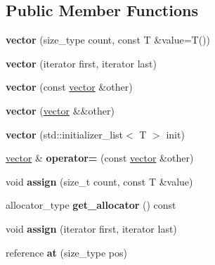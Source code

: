 \subsection*{Public Member Functions}
\begin{DoxyCompactItemize}
\item 
\mbox{\label{classvector_a1cc23d522dbc47bd2a178231685dd107}} 
{\bfseries vector} (size\+\_\+type count, const T \&value=T())
\item 
\mbox{\label{classvector_a795fe0c0a4f30d82ca01bf303053cfff}} 
{\bfseries vector} (iterator first, iterator last)
\item 
\mbox{\label{classvector_ab518694104914506f6f37d41208bf272}} 
{\bfseries vector} (const \mbox{\hyperlink{classvector}{vector}} \&other)
\item 
\mbox{\label{classvector_a87cb2a7a7e51160b390e815b45fbfca9}} 
{\bfseries vector} (\mbox{\hyperlink{classvector}{vector}} \&\&other)
\item 
\mbox{\label{classvector_aa4b69215b0307c01eb62115755b0888d}} 
{\bfseries vector} (std\+::initializer\+\_\+list$<$ T $>$ init)
\item 
\mbox{\label{classvector_a1e8974959eba66a6f2bf6c220c591c81}} 
\mbox{\hyperlink{classvector}{vector}} \& {\bfseries operator=} (const \mbox{\hyperlink{classvector}{vector}} \&other)
\item 
\mbox{\label{classvector_a6556d1274194a8998b91e471b24cf7d5}} 
void {\bfseries assign} (size\+\_\+t count, const T \&value)
\item 
\mbox{\label{classvector_a618facd570d11af908a3c5b4dcbd585d}} 
allocator\+\_\+type {\bfseries get\+\_\+allocator} () const
\item 
\mbox{\label{classvector_a0c1e5cc69d2bebe0e1c01661a1c9582e}} 
void {\bfseries assign} (iterator first, iterator last)
\item 
\mbox{\label{classvector_ad1ecb5c3ae62486ae6e31d7512865792}} 
reference {\bfseries at} (size\+\_\+type pos)

\end{DoxyCompactItemize}
